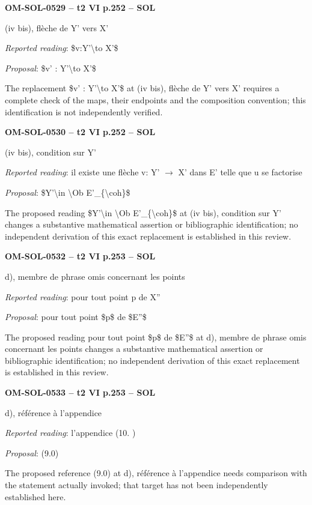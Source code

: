 \par\noindent\textbf{OM-SOL-0529 -- t2 VI p.252 -- SOL}\par
(iv bis), flèche de Y' vers X'\par
\emph{Reported reading}: \$v:Y'\textbackslash{}to X'\$\par
\emph{Proposal}: \$v' : Y'\textbackslash{}to X'\$\par
The replacement \$v' : Y'\textbackslash{}to X'\$ at (iv bis), flèche de Y' vers X' requires a complete check of the maps, their endpoints and the composition convention; this identification is not independently verified.\par
\par\noindent\textbf{OM-SOL-0530 -- t2 VI p.252 -- SOL}\par
(iv bis), condition sur Y'\par
\emph{Reported reading}: il existe une flèche v: Y' \ensuremath{\to} X' dans E' telle que u se factorise\par
\emph{Proposal}: \$Y'\textbackslash{}in \textbackslash{}Ob E'\_\{\textbackslash{}coh\}\$\par
The proposed reading \$Y'\textbackslash{}in \textbackslash{}Ob E'\_\{\textbackslash{}coh\}\$ at (iv bis), condition sur Y' changes a substantive mathematical assertion or bibliographic identification; no independent derivation of this exact replacement is established in this review.\par
\par\noindent\textbf{OM-SOL-0532 -- t2 VI p.253 -- SOL}\par
d), membre de phrase omis concernant les points\par
\emph{Reported reading}: pour tout point p de X''\par
\emph{Proposal}: pour tout point \$p\$ de \$E''\$\par
The proposed reading pour tout point \$p\$ de \$E''\$ at d), membre de phrase omis concernant les points changes a substantive mathematical assertion or bibliographic identification; no independent derivation of this exact replacement is established in this review.\par
\par\noindent\textbf{OM-SOL-0533 -- t2 VI p.253 -- SOL}\par
d), référence à l'appendice\par
\emph{Reported reading}: l'appendice (10. )\par
\emph{Proposal}: (9.0)\par
The proposed reference (9.0) at d), référence à l'appendice needs comparison with the statement actually invoked; that target has not been independently established here.\par
